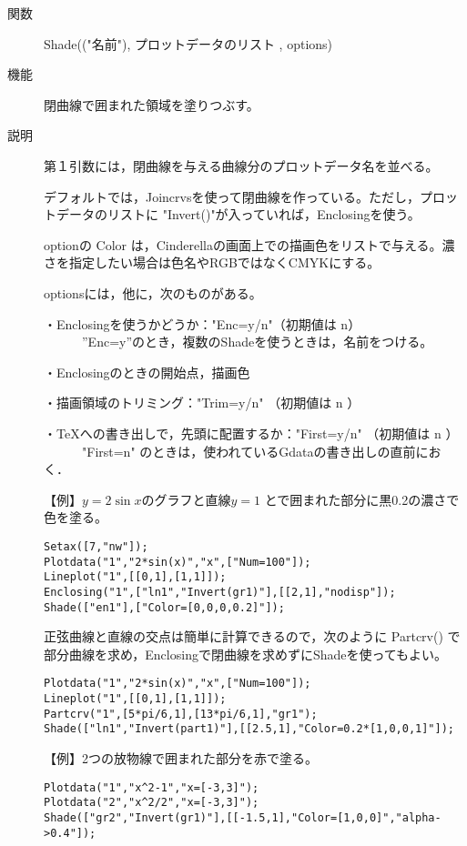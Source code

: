 \documentclass[papersize,a4paper,10pt,uplatex]{jsarticle}
\begin{document}
\begin{description}
\vspace{\baselineskip}
\hypertarget{shade}{}
\item[関数]Shade(("名前"), プロットデータのリスト , options)
\item[機能]閉曲線で囲まれた領域を塗りつぶす。
\item[説明]第１引数には，閉曲線を与える曲線分のプロットデータ名を並べる。

デフォルトでは，Joincrvsを使って閉曲線を作っている。ただし，プロットデータのリストに
"Invert()"が入っていれば，Enclosingを使う。

optionの Color は，Cinderellaの画面上での描画色をリストで与える。濃さを指定したい場合は色名やRGBではなくCMYKにする。

optionsには，他に，次のものがある。

・Enclosingを使うかどうか："Enc=y/n"（初期値は n）\\
　　　''Enc=y''のとき，複数のShadeを使うときは，名前をつける。

・Enclosingのときの開始点，描画色

・描画領域のトリミング："Trim=y/n" （初期値は n ）

・TeXへの書き出しで，先頭に配置するか："First=y/n" （初期値は n ）\\
　　　"First=n" のときは，使われているGdataの書き出しの直前におく．


\vspace{\baselineskip}
【例】$y=2\sin x$のグラフと直線$y=1$ とで囲まれた部分に黒0.2の濃さで色を塗る。
\begin{verbatim}
Setax([7,"nw"]);
Plotdata("1","2*sin(x)","x",["Num=100"]);
Lineplot("1",[[0,1],[1,1]]);
Enclosing("1",["ln1","Invert(gr1)"],[[2,1],"nodisp"]);
Shade(["en1"],["Color=[0,0,0,0.2]"]);
\end{verbatim}
\begin{center}  \end{center}

正弦曲線と直線の交点は簡単に計算できるので，次のように Partcrv() で部分曲線を求め，Enclosingで閉曲線を求めずにShadeを使ってもよい。
\begin{verbatim}
Plotdata("1","2*sin(x)","x",["Num=100"]);
Lineplot("1",[[0,1],[1,1]]);
Partcrv("1",[5*pi/6,1],[13*pi/6,1],"gr1");
Shade(["ln1","Invert(part1)"],[[2.5,1],"Color=0.2*[1,0,0,1]"]);
\end{verbatim}


\vspace{\baselineskip}
【例】2つの放物線で囲まれた部分を赤で塗る。
\begin{verbatim}
Plotdata("1","x^2-1","x=[-3,3]");
Plotdata("2","x^2/2","x=[-3,3]");
Shade(["gr2","Invert(gr1)"],[[-1.5,1],"Color=[1,0,0]","alpha->0.4"]);
\end{verbatim}


\end{description}
\end{document}
